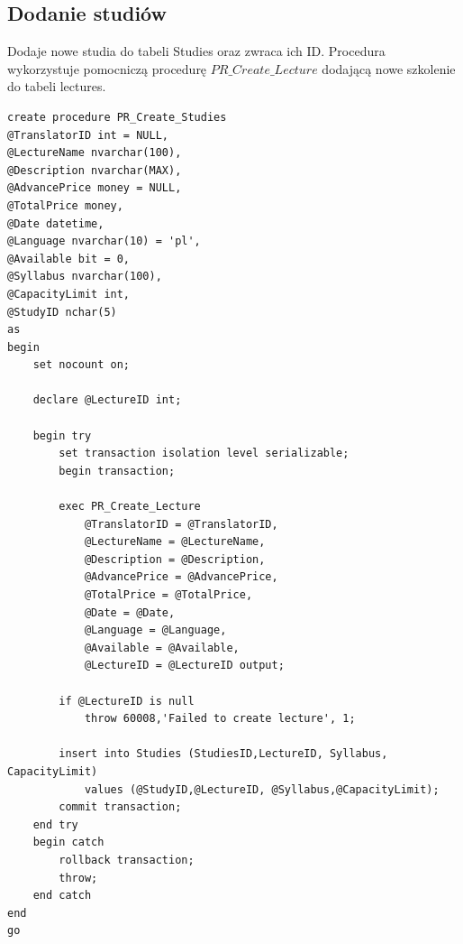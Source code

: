 \documentclass[11pt,a4paper]{article}
\begin{document}
\subsection{Dodanie studiów}
Dodaje nowe studia do tabeli Studies oraz zwraca ich ID. Procedura wykorzystuje pomocniczą procedurę $PR\_Create\_Lecture$ dodającą nowe szkolenie do tabeli lectures.
\begin{Verbatim}[breaklines=true]
create procedure PR_Create_Studies
@TranslatorID int = NULL,
@LectureName nvarchar(100),
@Description nvarchar(MAX),
@AdvancePrice money = NULL,
@TotalPrice money,
@Date datetime,
@Language nvarchar(10) = 'pl',
@Available bit = 0,
@Syllabus nvarchar(100),
@CapacityLimit int,
@StudyID nchar(5)
as
begin
    set nocount on;

    declare @LectureID int;

    begin try
        set transaction isolation level serializable;
        begin transaction;

        exec PR_Create_Lecture
            @TranslatorID = @TranslatorID,
            @LectureName = @LectureName,
            @Description = @Description,
            @AdvancePrice = @AdvancePrice,
            @TotalPrice = @TotalPrice,
            @Date = @Date,
            @Language = @Language,
            @Available = @Available,
            @LectureID = @LectureID output;

        if @LectureID is null
            throw 60008,'Failed to create lecture', 1;

        insert into Studies (StudiesID,LectureID, Syllabus, CapacityLimit)
            values (@StudyID,@LectureID, @Syllabus,@CapacityLimit);
        commit transaction;
    end try
    begin catch
        rollback transaction;
        throw;
    end catch
end
go
\end{Verbatim}
\end{document}

